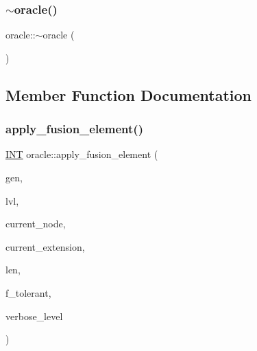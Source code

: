 \mbox{\label{classoracle_abb19e0e90f7ab76bf56bd3353e32518d}} 
\subsubsection{\texorpdfstring{$\sim$oracle()}{~oracle()}}
{\footnotesize\ttfamily oracle\+::$\sim$oracle (\begin{DoxyParamCaption}{ }\end{DoxyParamCaption})}



\subsection{Member Function Documentation}
\mbox{\label{classoracle_a934dc7bfa4c5ad2086ce7c63de5ba536}} 
\subsubsection{\texorpdfstring{apply\+\_\+fusion\+\_\+element()}{apply\_fusion\_element()}}
{\footnotesize\ttfamily \mbox{\hyperlink{galois_8h_a09fddde158a3a20bd2dcadb609de11dc}{I\+NT}} oracle\+::apply\+\_\+fusion\+\_\+element (\begin{DoxyParamCaption}\item[{\mbox{\hyperlink{classgenerator}{generator}} $\ast$}]{gen,  }\item[{\mbox{\hyperlink{galois_8h_a09fddde158a3a20bd2dcadb609de11dc}{I\+NT}}}]{lvl,  }\item[{\mbox{\hyperlink{galois_8h_a09fddde158a3a20bd2dcadb609de11dc}{I\+NT}}}]{current\+\_\+node,  }\item[{\mbox{\hyperlink{galois_8h_a09fddde158a3a20bd2dcadb609de11dc}{I\+NT}}}]{current\+\_\+extension,  }\item[{\mbox{\hyperlink{galois_8h_a09fddde158a3a20bd2dcadb609de11dc}{I\+NT}}}]{len,  }\item[{\mbox{\hyperlink{galois_8h_a09fddde158a3a20bd2dcadb609de11dc}{I\+NT}}}]{f\+\_\+tolerant,  }\item[{\mbox{\hyperlink{galois_8h_a09fddde158a3a20bd2dcadb609de11dc}{I\+NT}}}]{verbose\+\_\+level }\end{DoxyParamCaption})}

